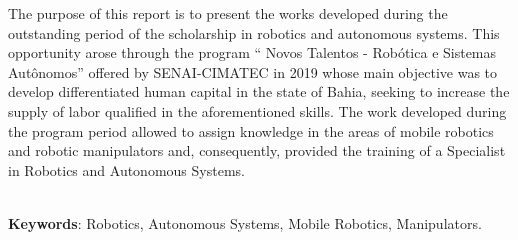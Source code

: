 \begin{thesisabastract}
  
  The purpose of this report is to present the works developed during the outstanding period of the scholarship in robotics and autonomous systems. This opportunity arose through the program `` Novos Talentos - Robótica e Sistemas Autônomos'' offered by SENAI-CIMATEC in 2019 whose main objective was to develop differentiated human capital in the state of Bahia, seeking to increase the supply of labor qualified in the aforementioned skills. The work developed during the program period allowed to assign knowledge in the areas of mobile robotics and robotic manipulators and, consequently, provided the training of a Specialist in Robotics and Autonomous Systems.

\ \\


\textbf{Keywords}: Robotics, Autonomous Systems, Mobile Robotics, Manipulators.

\end{thesisabastract}
